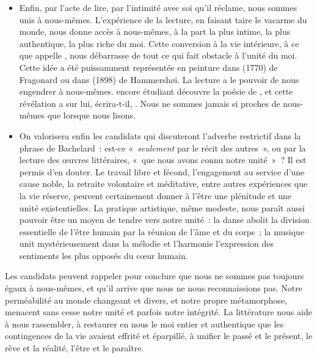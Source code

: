 {\begin{itemize}[label=\textbullet]
\item Enfin, par l'acte de lire, par l'intimité avec soi qu'il réclame, nous sommes unis à nous-mêmes.
L'expérience de la lecture, en faisant taire le vacarme du monde, nous donne
accès à nous-mêmes, à la part la plus intime, la plus authentique, la plus riche du moi.
Cette conversion à la vie intérieure, à ce que  appelle , nous
débarrasse de tout ce qui fait obstacle à l'unité du moi. Cette idée a été puissamment
représentée en peinture dans  (1770) de Fragonard ou dans  (1898) de Hammersh{\o}i. La lecture a le pouvoir de nous engendrer à
nous-mêmes.  encore étudiant découvre la poésie de , et cette
révélation a sur lui, écrira-t-il, .
Nous ne sommes jamais si proches de nous-mêmes que lorsque nous lisons.

\item On valorisera enfin les candidats qui discuteront l'adverbe restrictif dans la phrase de
Bachelard~: est-ce «~\emph{seulement} par le récit des autres~», ou par la lecture des œuvres
littéraires, «~que nous avons connu notre unité~»~? Il est permis d'en douter. Le travail
libre et fécond, l'engagement au service d'une cause noble, la retraite volontaire et
méditative, entre autres expériences que la vie réserve, peuvent certainement donner
à l'être une plénitude et une unité existentielles. La pratique artistique, même modeste,
nous paraît aussi pouvoir être un moyen de tendre vers notre unité~: la danse abolit la
division essentielle de l'être humain par la réunion de l'âme et du corps~; la musique
unit mystérieusement dans la mélodie et l'harmonie l'expression des sentiments les
plus opposés du cœur humain.
\end{itemize}

\bigskip

Les candidats peuvent rappeler pour conclure que nous ne sommes pas toujours
égaux à nous-mêmes, et qu'il arrive que nous ne nous reconnaissions pas. Notre
perméabilité au monde changeant et divers, et notre propre métamorphose, menacent
sans cesse notre unité et parfois notre intégrité. La littérature nous aide à nous
rassembler, à restaurer en nous le moi entier et authentique que les contingences de
la vie avaient effrité et éparpillé, à unifier le passé et le présent, le rêve et la réalité,
l'être et le paraître.}%
